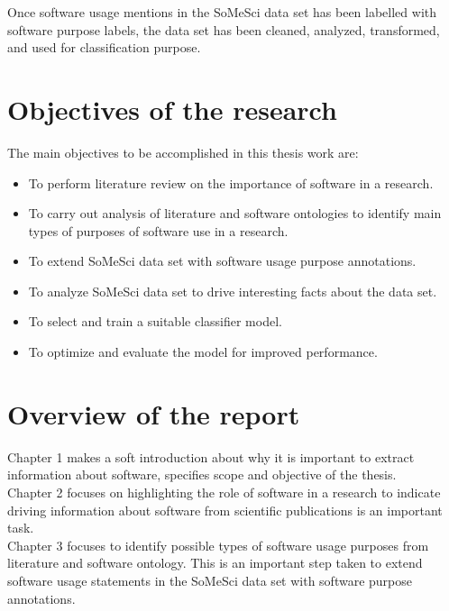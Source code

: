 Once software usage mentions in the SoMeSci data set has been labelled with software purpose labels, the data set has been cleaned, analyzed, transformed, and used for classification purpose.


\section{Objectives of the research}
\label{sec:intro:Objectives}
The main objectives to be accomplished in this thesis work are:


\begin{itemize}
	\itemsep0em 
    \item To perform literature review on the importance of software in a research.
    \item To carry out analysis of literature and software ontologies to identify main types of purposes of software use in a research.
    \item To extend \ac{SoMeSci} data set with software usage purpose annotations. 
    \item To analyze \ac{SoMeSci} data set to drive interesting facts about the data set. 
    \item To select and train a suitable classifier model.
    \item To optimize and evaluate the model for improved performance.
	
\end{itemize}


%
%
\section{ Overview of the report }
\label{sec:intro:Overview}
\noindent Chapter 1  makes a soft introduction about why it is important to extract information about software, specifies scope and objective of the thesis. \\

\noindent Chapter 2 focuses on highlighting the role of software in a research to indicate driving information about software from scientific publications is an important task. \\

\noindent Chapter 3 focuses to identify possible types of software usage purposes from literature and software ontology. This is an important step taken to extend software usage statements in the \ac{SoMeSci} data set with software purpose annotations. \\

